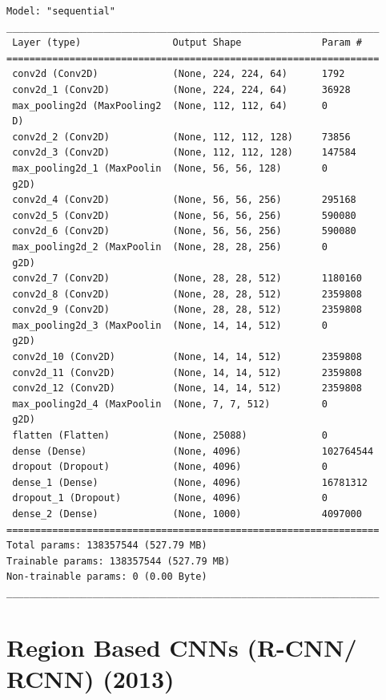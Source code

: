 \begin{lstlisting}[numbers=none]
Model: "sequential"
_________________________________________________________________
 Layer (type)                Output Shape              Param #   
=================================================================
 conv2d (Conv2D)             (None, 224, 224, 64)      1792      
 conv2d_1 (Conv2D)           (None, 224, 224, 64)      36928     
 max_pooling2d (MaxPooling2  (None, 112, 112, 64)      0         
 D)                                                              
 conv2d_2 (Conv2D)           (None, 112, 112, 128)     73856     
 conv2d_3 (Conv2D)           (None, 112, 112, 128)     147584    
 max_pooling2d_1 (MaxPoolin  (None, 56, 56, 128)       0         
 g2D)                                                            
 conv2d_4 (Conv2D)           (None, 56, 56, 256)       295168    
 conv2d_5 (Conv2D)           (None, 56, 56, 256)       590080    
 conv2d_6 (Conv2D)           (None, 56, 56, 256)       590080    
 max_pooling2d_2 (MaxPoolin  (None, 28, 28, 256)       0         
 g2D)                                                            
 conv2d_7 (Conv2D)           (None, 28, 28, 512)       1180160   
 conv2d_8 (Conv2D)           (None, 28, 28, 512)       2359808   
 conv2d_9 (Conv2D)           (None, 28, 28, 512)       2359808   
 max_pooling2d_3 (MaxPoolin  (None, 14, 14, 512)       0         
 g2D)                                                            
 conv2d_10 (Conv2D)          (None, 14, 14, 512)       2359808   
 conv2d_11 (Conv2D)          (None, 14, 14, 512)       2359808   
 conv2d_12 (Conv2D)          (None, 14, 14, 512)       2359808   
 max_pooling2d_4 (MaxPoolin  (None, 7, 7, 512)         0         
 g2D)
 flatten (Flatten)           (None, 25088)             0         
 dense (Dense)               (None, 4096)              102764544 
 dropout (Dropout)           (None, 4096)              0         
 dense_1 (Dense)             (None, 4096)              16781312  
 dropout_1 (Dropout)         (None, 4096)              0         
 dense_2 (Dense)             (None, 1000)              4097000   
=================================================================
Total params: 138357544 (527.79 MB)
Trainable params: 138357544 (527.79 MB)
Non-trainable params: 0 (0.00 Byte)
_________________________________________________________________
\end{lstlisting}


\section{Region Based CNNs (R-CNN/ RCNN) (2013) \cite{arxiv-1311.2524v5-rcnn,https://www.geeksforgeeks.org/r-cnn-region-based-cnns/}}\label{Region Based CNNs (R-CNN/ RCNN)}

